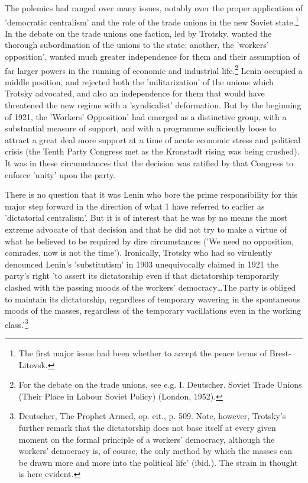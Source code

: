 The polemics had ranged over many issues, notably over the proper application of 'democratic centralism' and the role of the trade unions in the new Soviet state.\footnote{The first major issue had been whether to accept the peace terms of Brest-Litovsk.} In the debate on the trade unions one faction, led by Trotsky, wanted the thorough subordination of the unions to the state; another, the 'workers' opposition', wanted much greater independence for them and their assumption of far larger powers in the running of economic and  industrial life.\footnote{For the debate on the trade unions, see e.g. I. Deutscher. Soviet Trade Unions (Their Place in Labour Soviet Policy) (London, 1952).} Lenin occupied a middle position, and rejected both the 'militarization' of the unions which Trotsky advocated, and also an independence for them that would have threatened the new regime with a 'syndicalist' deformation. But by the beginning of 1921, the 'Workers' Opposition' had emerged as a distinctive group, with a substantial measure of support, and with a programme sufficiently loose to attract a great deal more support at a time of acute economic stress and political crisis (the Tenth Party Congress met as the Kronstadt rising was being crushed). It was in these circumstances that the decision was ratified by that Congress to enforce 'unity' upon the party.

There is no question that it was Lenin who bore the prime responsibility for this major step forward in the direction of what 1 have referred to earlier as 'dictatorial centralism'. But it is of interest that he was by no means the most extreme advocate of that decision and that he did not try to make a virtue of what he believed to be required by dire circumstances ('We need no opposition, comrades, now is not the time'). Ironically, Trotsky who had so virulently denounced Lenin's 'substitutism' in 1903 unequivocally claimed in 1921 the party's right 'to assert its dictatorship even if that dictatorship temporarily clashed with the passing moods of the workers' democracy\dots The party is obliged to maintain its dictatorship, regardless of temporary wavering in the spontaneous moods of the masses, regardless of the temporary vacillations even in the working class.'\footnote{Deutscher, The Prophet Armed, op. cit., p. 509. Note, however, Trotsky's further remark that the dictatorship does not base itself at every given moment on the formal principle of a workers' democracy, although the workers' democracy is, of course, the only method by which the masses can be drawn more and more into the political life' (ibid.). The strain in thought is here evident.}

